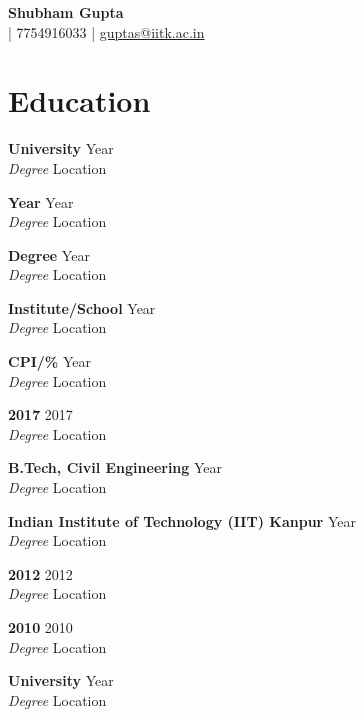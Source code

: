 \documentclass[11pt,a4paper]{article}
\begin{document}
\begin{center}
    {\huge \textbf{Shubham Gupta}} \\ \vspace{2pt}
     | 7754916033 | \href{mailto:guptas@iitk.ac.in}{guptas@iitk.ac.in}
\end{center}


\section*{Education}

\noindent \textbf{University} \hfill Year \\
\textit{Degree} \hfill Location



\noindent \textbf{Year} \hfill Year \\
\textit{Degree} \hfill Location



\noindent \textbf{Degree} \hfill Year \\
\textit{Degree} \hfill Location



\noindent \textbf{Institute/School} \hfill Year \\
\textit{Degree} \hfill Location



\noindent \textbf{CPI/\%} \hfill Year \\
\textit{Degree} \hfill Location



\noindent \textbf{2017} \hfill 2017 \\
\textit{Degree} \hfill Location



\noindent \textbf{B.Tech, Civil Engineering} \hfill Year \\
\textit{Degree} \hfill Location



\noindent \textbf{Indian Institute of Technology (IIT) Kanpur} \hfill Year \\
\textit{Degree} \hfill Location



\noindent \textbf{2012} \hfill 2012 \\
\textit{Degree} \hfill Location



\noindent \textbf{2010} \hfill 2010 \\
\textit{Degree} \hfill Location



\noindent \textbf{University} \hfill Year \\
\textit{Degree} \hfill Location
\end{document}
